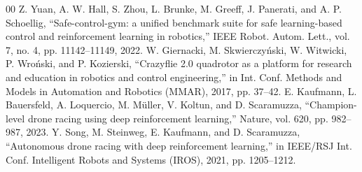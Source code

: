 \documentclass[conference]{IEEEtran}
\begin{document}
\begin{thebibliography}{00}
 Z. Yuan, A. W. Hall, S. Zhou, L. Brunke, M. Greeff, J. Panerati, and A. P. Schoellig, ``Safe-control-gym: a unified benchmark suite for safe learning-based control and reinforcement learning in robotics,'' IEEE Robot. Autom. Lett., vol. 7, no. 4, pp. 11142--11149, 2022.
 W. Giernacki, M. Skwierczy\'nski, W. Witwicki, P. Wro\'nski, and P. Kozierski, ``Crazyflie 2.0 quadrotor as a platform for research and education in robotics and control engineering,'' in Int. Conf. Methods and Models in Automation and Robotics (MMAR), 2017, pp. 37--42.
 E. Kaufmann, L. Bauersfeld, A. Loquercio, M. M\"uller, V. Koltun, and D. Scaramuzza, ``Champion-level drone racing using deep reinforcement learning,'' Nature, vol. 620, pp. 982--987, 2023.
 Y. Song, M. Steinweg, E. Kaufmann, and D. Scaramuzza, ``Autonomous drone racing with deep reinforcement learning,'' in IEEE/RSJ Int. Conf. Intelligent Robots and Systems (IROS), 2021, pp. 1205--1212.
\end{thebibliography}
\end{document}
